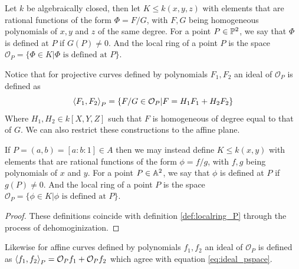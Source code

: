 \begin{definition}
\label{def:localring_P}
    Let $k$ be algebraically closed, then let $K\leq k(x,y,z)$ with elements that are rational functions of the form $\Phi=F/G$, with $F, G$ being homogeneous polynomials of $x,y$ and $z$ of the same degree. For a point $P\in\P^2$, we say that $\Phi$ is defined at $P$ if $G(P)\neq 0$. And the local ring of a point $P$ is the space $\mathcal{O}_P=\{\Phi\in K| \Phi \text{ is defined at }P\}$.
\end{definition}

Notice that for projective curves defined by polynomials $F_1,F_2$ an ideal of $\mathcal{O}_P$ is defined as 
\begin{equation}
\label{eq:ideal_pspace}
    \ip{F_1,F_2}_P=\{F/G\in\mathcal{O}_P| F=H_1F_1+H_2F_2 \}
\end{equation}
Where $H_1,H_2\in k[X,Y,Z]$ such that $F$ is homogeneous of degree equal to that of $G$.
We can also restrict these constructions to the affine plane.

\begin{prop}
\label{prop:localring_A}
If $P=(a,b)=[a:b:1]\in A$ then we may instead define $K\leq k(x,y)$ with elements that are rational functions of the form $\phi=f/g$, with $f,g$ being polynomials of $x$ and $y$. For a point $P\in\A^2$, we say that $\phi$ is defined at $P$ if $g(P)\neq 0$. And the local ring of a point $P$ is the space $\mathcal{O}_P=\{\phi\in K| \phi \text{ is defined at }P\}$.
\end{prop}
\begin{proof}
These definitions coincide with definition \ref{def:localring_P} through the process of dehomoginization.
\end{proof}

Likewise for affine curves defined by polynomials $f_1,f_2$ an ideal of $\mathcal{O}_P$ is defined as $\ip{f_1,f_2}_P=\mathcal{O}_Pf_1+\mathcal{O}_Pf_2$ which agree with equation \ref{eq:ideal_pspace}.

